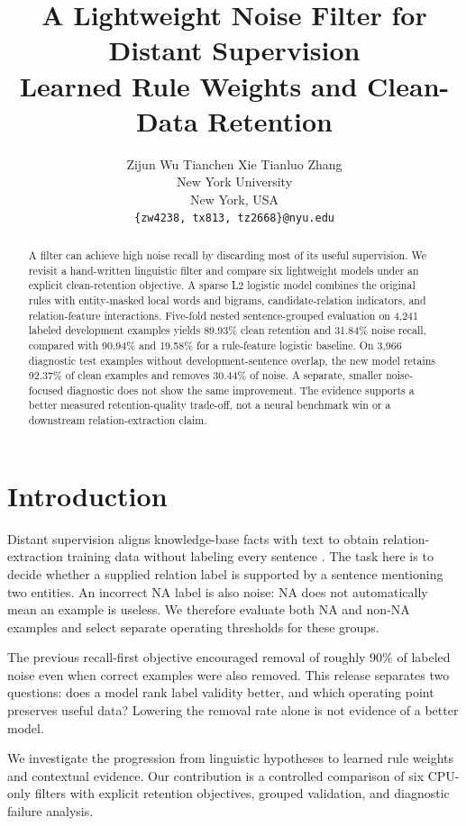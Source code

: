 \documentclass[11pt]{article}
\title{A Lightweight Noise Filter for Distant Supervision\\
\large Learned Rule Weights and Clean-Data Retention}
\author{
  Zijun Wu \quad Tianchen Xie \quad Tianluo Zhang\\
  New York University\\
  New York, USA\\
  \texttt{\{zw4238, tx813, tz2668\}@nyu.edu}
}
\begin{document}
\maketitle
\begin{abstract}

A filter can achieve high noise recall by discarding most of its useful supervision. We revisit a hand-written linguistic filter and compare six lightweight models under an explicit clean-retention objective. A sparse L2 logistic model combines the original rules with entity-masked local words and bigrams, candidate-relation indicators, and relation-feature interactions. Five-fold nested sentence-grouped evaluation on 4,241 labeled development examples yields 89.93\% clean retention and 31.84\% noise recall, compared with 90.94\% and 19.58\% for a rule-feature logistic baseline. On 3,966 diagnostic test examples without development-sentence overlap, the new model retains 92.37\% of clean examples and removes 30.44\% of noise. A separate, smaller noise-focused diagnostic does not show the same improvement. The evidence supports a better measured retention-quality trade-off, not a neural benchmark win or a downstream relation-extraction claim.

\end{abstract}

\section{Introduction}

Distant supervision aligns knowledge-base facts with text to obtain relation-extraction training data without labeling every sentence \citep{mintz-etal-2009-distant}. The task here is to decide whether a supplied relation label is supported by a sentence mentioning two entities. An incorrect NA label is also noise: NA does not automatically mean an example is useless. We therefore evaluate both NA and non-NA examples and select separate operating thresholds for these groups.

The previous recall-first objective encouraged removal of roughly 90\% of labeled noise even when correct examples were also removed. This release separates two questions: does a model rank label validity better, and which operating point preserves useful data? Lowering the removal rate alone is not evidence of a better model.

We investigate the progression from linguistic hypotheses to learned rule weights and contextual evidence. Our contribution is a controlled comparison of six CPU-only filters with explicit retention objectives, grouped validation, and diagnostic failure analysis.
\end{document}
